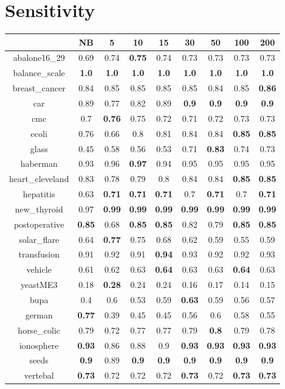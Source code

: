 \documentclass{article}%
\begin{document}
%
\section*{Sensitivity}%
\begin{tabular}{c|cccccccc}%
\hline%
&NB&5&10&15&30&50&100&200\\%
\hline%
abalone16\_29&0.69&0.74&\textbf{0.75}&0.74&0.73&0.73&0.73&0.73\\%
\hline%
balance\_scale&\textbf{1.0}&\textbf{1.0}&\textbf{1.0}&\textbf{1.0}&\textbf{1.0}&\textbf{1.0}&\textbf{1.0}&\textbf{1.0}\\%
\hline%
breast\_cancer&0.84&0.85&0.85&0.85&0.85&0.84&0.85&\textbf{0.86}\\%
\hline%
car&0.89&0.77&0.82&0.89&\textbf{0.9}&\textbf{0.9}&\textbf{0.9}&\textbf{0.9}\\%
\hline%
cmc&0.7&\textbf{0.76}&0.75&0.72&0.71&0.72&0.73&0.73\\%
\hline%
ecoli&0.76&0.66&0.8&0.81&0.84&0.84&\textbf{0.85}&\textbf{0.85}\\%
\hline%
glass&0.45&0.58&0.56&0.53&0.71&\textbf{0.83}&0.74&0.73\\%
\hline%
haberman&0.93&0.96&\textbf{0.97}&0.94&0.95&0.95&0.95&0.95\\%
\hline%
heart\_cleveland&0.83&0.78&0.79&0.8&0.84&0.84&\textbf{0.85}&\textbf{0.85}\\%
\hline%
hepatitis&0.63&\textbf{0.71}&\textbf{0.71}&\textbf{0.71}&0.7&\textbf{0.71}&0.7&\textbf{0.71}\\%
\hline%
new\_thyroid&0.97&\textbf{0.99}&\textbf{0.99}&\textbf{0.99}&\textbf{0.99}&\textbf{0.99}&\textbf{0.99}&\textbf{0.99}\\%
\hline%
postoperative&\textbf{0.85}&0.68&\textbf{0.85}&\textbf{0.85}&0.82&0.79&\textbf{0.85}&\textbf{0.85}\\%
\hline%
solar\_flare&0.64&\textbf{0.77}&0.75&0.68&0.62&0.59&0.55&0.59\\%
\hline%
transfusion&0.91&0.92&0.91&\textbf{0.94}&0.93&0.92&0.92&0.93\\%
\hline%
vehicle&0.61&0.62&0.63&\textbf{0.64}&0.63&0.63&\textbf{0.64}&0.63\\%
\hline%
yeastME3&0.18&\textbf{0.28}&0.24&0.24&0.16&0.17&0.14&0.15\\%
\hline%
bupa&0.4&0.6&0.53&0.59&\textbf{0.63}&0.59&0.56&0.57\\%
\hline%
german&\textbf{0.77}&0.39&0.45&0.45&0.56&0.6&0.58&0.55\\%
\hline%
horse\_colic&0.79&0.72&0.77&0.77&0.79&\textbf{0.8}&0.79&0.78\\%
\hline%
ionosphere&\textbf{0.93}&0.86&0.88&0.9&\textbf{0.93}&\textbf{0.93}&\textbf{0.93}&\textbf{0.93}\\%
\hline%
seeds&\textbf{0.9}&0.89&\textbf{0.9}&\textbf{0.9}&\textbf{0.9}&\textbf{0.9}&\textbf{0.9}&\textbf{0.9}\\%
\hline%
vertebal&\textbf{0.73}&0.72&0.72&0.72&\textbf{0.73}&0.72&\textbf{0.73}&\textbf{0.73}\\%
\hline%
\end{tabular}
\end{document}
